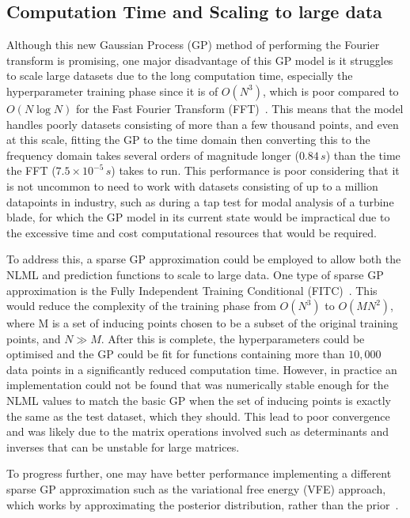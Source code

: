 \documentclass[12pt]{article}
\begin{document}
    \subsection{Computation Time and Scaling to large data}
    Although this new Gaussian Process (GP) method of performing the Fourier transform is promising, one major disadvantage of this GP model is it struggles to scale large datasets due to the long computation time, especially the hyperparameter training phase since it is of $O(N^3)$, which is poor compared to $O(N \log{N})$ for the Fast Fourier Transform (FFT)~\cite{murphy2023probabilistic}.
    This means that the model handles poorly datasets consisting of more than a few thousand points, and even at this scale, fitting the GP to the time domain then converting this to the frequency domain takes several orders of magnitude longer ($0.84 \, s$) than the time the FFT ($7.5 \times 10^{-5} \, s$) takes to run.
    This performance is poor considering that it is not uncommon to need to work with datasets consisting of up to a million datapoints in industry, such as during a tap test for modal analysis of a turbine blade, for which the GP model in its current state would be impractical due to the excessive time and cost computational resources that would be required.

    To address this, a sparse GP approximation could be employed to allow both the NLML and prediction functions to scale to large data.
    One type of sparse GP approximation is the Fully Independent Training Conditional (FITC)~\cite{q-candela}.
    This would reduce the complexity of the training phase from $O(N^3)$ to $O(MN^2)$, where M is a set of inducing points chosen to be a subset of the original training points, and $N \gg M$. 
    After this is complete, the hyperparameters could be optimised and the GP could be fit for functions containing more than $10,000$ data points in a significantly reduced computation time.
    However, in practice an implementation could not be found that was numerically stable enough for the NLML values to match the basic GP when the set of inducing points is exactly the same as the test dataset, which they should.
    This lead to poor convergence and was likely due to the matrix operations involved such as determinants and inverses that can be unstable for large matrices.

    To progress further, one may have better performance implementing a different sparse GP approximation such as the variational free energy (VFE) approach, which works by approximating the posterior distribution, rather than the prior~\cite{murphy2023probabilistic}.
\end{document}

